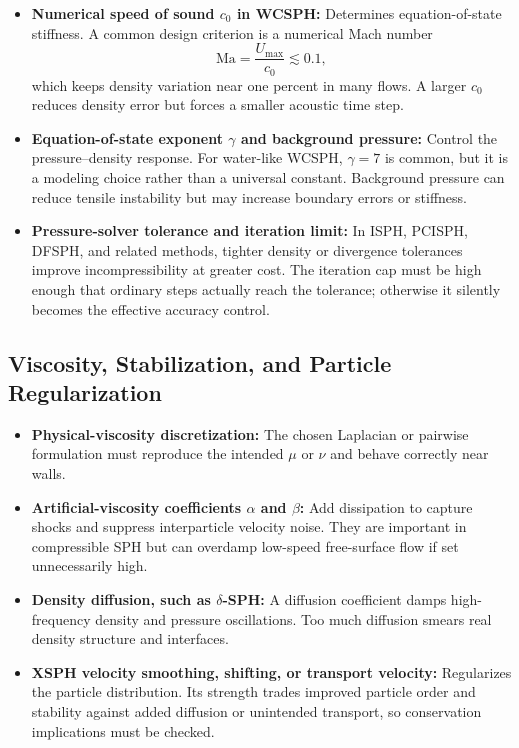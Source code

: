 \documentclass[11pt]{article}
\begin{document}
\begin{itemize}
    \item \textbf{Numerical speed of sound $c_0$ in WCSPH:} Determines
    equation-of-state stiffness. A common design criterion is a numerical Mach
    number
    \begin{equation}
        \mathrm{Ma}=\frac{U_{\max}}{c_0}\lesssim0.1,
    \end{equation}
    which keeps density variation near one percent in many flows. A larger
    $c_0$ reduces density error but forces a smaller acoustic time step.
    \item \textbf{Equation-of-state exponent $\gamma$ and background
    pressure:} Control the pressure--density response. For water-like WCSPH,
    $\gamma=7$ is common, but it is a modeling choice rather than a universal
    constant. Background pressure can reduce tensile instability but may
    increase boundary errors or stiffness.
    \item \textbf{Pressure-solver tolerance and iteration limit:} In ISPH,
    PCISPH, DFSPH, and related methods, tighter density or divergence tolerances
    improve incompressibility at greater cost. The iteration cap must be high
    enough that ordinary steps actually reach the tolerance; otherwise it
    silently becomes the effective accuracy control.
\end{itemize}

\subsection{Viscosity, Stabilization, and Particle Regularization}

\begin{itemize}
    \item \textbf{Physical-viscosity discretization:} The chosen Laplacian or
    pairwise formulation must reproduce the intended $\mu$ or $\nu$ and behave
    correctly near walls.
    \item \textbf{Artificial-viscosity coefficients $\alpha$ and $\beta$:}
    Add dissipation to capture shocks and suppress interparticle velocity
    noise. They are important in compressible SPH but can overdamp low-speed
    free-surface flow if set unnecessarily high.
    \item \textbf{Density diffusion, such as $\delta$-SPH:} A diffusion
    coefficient damps high-frequency density and pressure oscillations. Too
    much diffusion smears real density structure and interfaces.
    \item \textbf{XSPH velocity smoothing, shifting, or transport velocity:}
    Regularizes the particle distribution. Its strength trades improved
    particle order and stability against added diffusion or unintended
    transport, so conservation implications must be checked.
\end{itemize}
\end{document}
